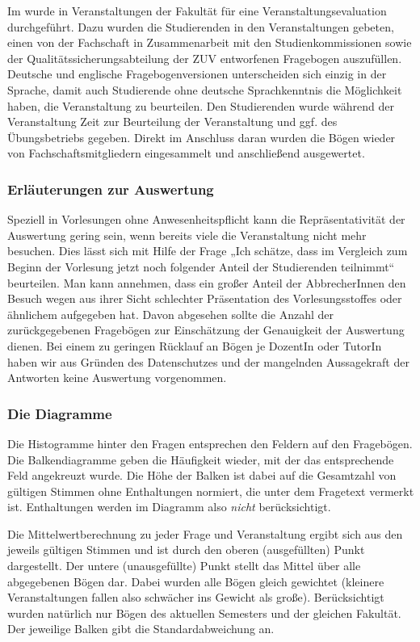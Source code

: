 Im \termlong{} wurde in Veranstaltungen der Fakultät für \facultylong{} eine Veranstaltungsevaluation durchgeführt. Dazu wurden die Studierenden in den Veranstaltungen gebeten, einen von der Fachschaft in Zusammenarbeit mit den Studienkommissionen sowie der Qualitätssicherungsabteilung der ZUV entworfenen Fragebogen auszufüllen. Deutsche und englische Fragebogenversionen unterscheiden sich einzig in der Sprache, damit auch Studierende ohne deutsche Sprachkenntnis die Möglichkeit haben, die Veranstaltung zu beurteilen. Den Studierenden wurde während der Veranstaltung Zeit zur Beurteilung der Veranstaltung und ggf. des Übungsbetriebs gegeben. Direkt im Anschluss daran wurden die Bögen wieder von Fachschaftsmitgliedern eingesammelt und anschließend ausgewertet.


\subsubsection{Erläuterungen zur Auswertung}

Speziell in Vorlesungen ohne Anwesenheitspflicht kann die Repräsentativität der Auswertung gering sein, wenn bereits viele die Veranstaltung nicht mehr besuchen. Dies lässt sich mit Hilfe
der Frage  „Ich schätze, dass im Vergleich zum Beginn der Vorlesung jetzt noch folgender Anteil der Studierenden teilnimmt“ beurteilen. Man kann annehmen, dass ein großer Anteil der AbbrecherInnen den Besuch wegen aus ihrer Sicht schlechter Präsentation des Vorlesungsstoffes oder ähnlichem aufgegeben hat. Davon abgesehen sollte die Anzahl der zurückgegebenen Fragebögen zur Einschätzung der Genauigkeit der Auswertung dienen. Bei einem zu geringen Rücklauf an Bögen je DozentIn oder TutorIn haben wir aus Gründen des Datenschutzes und der mangelnden Aussagekraft der Antworten keine Auswertung vorgenommen.



\subsubsection{Die Diagramme}

Die Histogramme hinter den Fragen entsprechen den Feldern auf den Fragebögen. Die Balkendiagramme geben die Häufigkeit wieder, mit der das entsprechende Feld angekreuzt wurde. Die Höhe der Balken ist dabei auf die Gesamtzahl von gültigen Stimmen ohne Enthaltungen normiert, die unter dem Fragetext vermerkt ist. Enthaltungen werden im Diagramm also \emph{nicht} berücksichtigt.

Die Mittelwertberechnung zu jeder Frage und Veranstaltung ergibt sich aus den jeweils gültigen Stimmen und ist durch den oberen (ausgefüllten) Punkt dargestellt. Der untere (unausgefüllte) Punkt stellt das Mittel über alle abgegebenen Bögen dar. Dabei wurden alle Bögen gleich gewichtet (kleinere Veranstaltungen fallen also schwächer ins Gewicht als große). Berücksichtigt wurden natürlich nur Bögen des aktuellen Semesters und der gleichen Fakultät. Der
jeweilige Balken gibt die Standardabweichung an.

